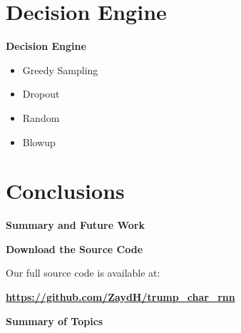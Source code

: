 \documentclass[10pt,aspectratio=169]{beamer}
\begin{document}
  \section{Decision Engine}
	\begin{frame}{\textbf{Decision Engine}}
		
		\begin{itemize}
			\item Greedy Sampling
			\item Dropout
			\item Random
			\item Blowup %
		\end{itemize}
		
	\end{frame}

  \section{Conclusions}
  \begin{frame}{\textbf{Summary and Future Work}}
  
  \end{frame}

  \begin{frame}{\textbf{Download the Source Code}}
  
    Our full source code is available at:
    
    \begin{center}
      \href{https://github.com/ZaydH/trump_char_rnn}{\textbf{\color{ucscBlue} https://github.com/ZaydH/trump\_char\_rnn}}
    \end{center}
  
  \end{frame}


  \begin{frame}{\textbf{Summary of Topics}}{}
    \tableofcontents
  \end{frame}
	
\end{document}
